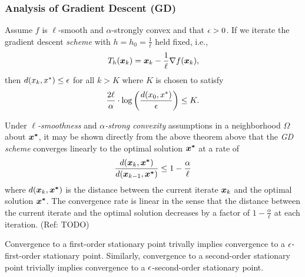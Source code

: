 \documentclass[10pt]{article}
\begin{document}
        
        \newpage

        \subsubsection*{Analysis of Gradient Descent (GD)}

            \begin{theorem} Assume $f$ is $\ell$-smooth and $\alpha$-strongly convex and that $\epsilon > 0$.
                If we iterate the gradient descent \emph{scheme} with $h = h_0 = \frac{1}{\ell}$ held fixed, i.e.,
                $$
                    T_{h}(\bm{x}_k) = \bm{x}_k - \frac{1}{\ell} \nabla f(\bm{x}_k),
                $$
                then $d(x_k, x^*) \leq \epsilon$ for all $k > K$ where $K$ is chosen to satisfy
                $$
                    \frac{2\ell}{\alpha} \cdot \log\left(\frac{d(x_0, x^*)}{\epsilon}\right) \leq K.
                $$
            \end{theorem}

            \begin{remark}
                Under \emph{$\ell$-smoothness} and \emph{$\alpha$-strong convexity} assumptions
                in a neighborhood $\Omega$ about $\bm{x^*}$, it may be shown directly from 
                the above theorem above that the \emph{GD scheme} converges linearly to 
                the optimal solution $\bm{x^*}$ at a rate of
                $$
                    \frac{d(\bm{x}_k, \bm{x^*})}{d(\bm{x}_{k-1}, \bm{x^*})} \leq 1 - \frac{\alpha}{\ell}
                $$
                where $d(\bm{x}_k, \bm{x^*})$ is the distance between the current iterate $\bm{x}_k$ and 
                the optimal solution $\bm{x^*}$. The convergence rate is linear in the sense that the 
                distance between the current iterate and the optimal solution decreases by a factor of 
                $1 - \frac{\alpha}{\ell}$ at each iteration. (Ref: TODO)
            \end{remark}

            \begin{remark}
                Convergence to a first-order stationary point trivally
                implies convergence to a $\epsilon$-first-order stationary point.
                Similarly, convergence to a second-order stationary point trivially
                implies convergence to a $\epsilon$-second-order stationary point.
            \end{remark}

            \medskip
\end{document}
